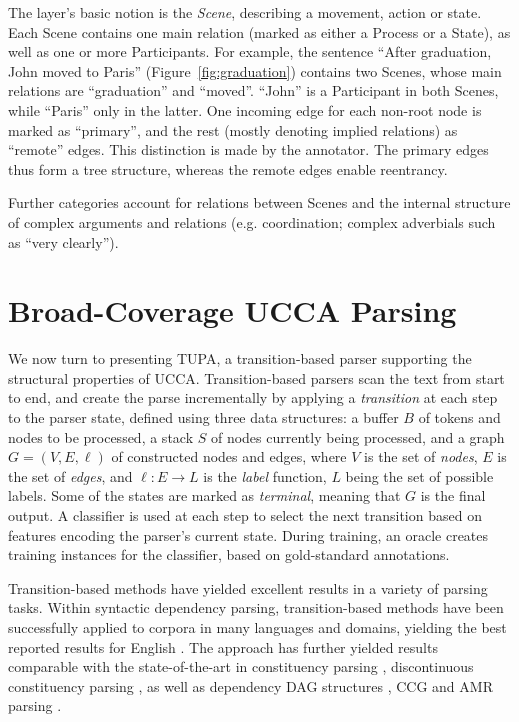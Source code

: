 \documentclass[11pt]{article}
\newcommand{\parser}[1]{TUPA\textsubscript{#1}}
\newcommand{\figref}[1]{Figure~\ref{#1}}
\begin{document}
The layer's basic notion is the {\it Scene}, describing a movement, action or state.
Each Scene contains one main relation (marked as either a Process or a State),
as well as one or more Participants.
For example, the sentence ``After graduation, John moved to Paris'' (\figref{fig:graduation})
contains two Scenes, whose main relations are ``graduation'' and ``moved''.
``John'' is a Participant in both Scenes, while ``Paris'' only in the latter.
One incoming edge for each non-root node is marked as ``primary'',
and the rest (mostly denoting implied relations) as ``remote'' edges.
This distinction is made by the annotator.
The primary edges thus form a tree structure, whereas the remote edges enable reentrancy.

Further categories account for relations between Scenes and the internal structure of
complex arguments and relations (e.g. coordination; complex
adverbials such as ``very clearly'').


\section{Broad-Coverage UCCA Parsing}\label{sec:direct_approach}

We now turn to presenting \parser{},
a transition-based parser supporting the structural properties of UCCA.
Transition-based parsers \cite{Nivre03anefficient} scan the text from start to end,
and create the parse incrementally by applying a \textit{transition}
at each step to the parser state,
defined using three data structures: a buffer $B$ of tokens and nodes to be processed,
a stack $S$ of nodes currently being processed,
and a graph $G=(V,E,\ell)$ of constructed nodes and edges,
where $V$ is the set of \emph{nodes}, $E$ is the set of \emph{edges},
and $\ell : E \to L$ is the \emph{label} function, $L$ being the set of possible labels.
Some of the states are marked as \textit{terminal}, meaning that $G$ is the final output.
A classifier is used at each step to select the next transition based on features
encoding the parser's current state.
During training, an oracle creates training instances for the classifier,
based on gold-standard annotations.

Transition-based methods have yielded excellent
results in a variety of parsing tasks.
Within syntactic dependency parsing, transition-based methods
have been successfully applied to corpora in many languages and domains, yielding
the best reported results for English
\cite{dyer2015transition,andor2016globally,kiperwasser2016simple}.
The approach has further yielded results comparable with the state-of-the-art in
constituency parsing \cite{sagae2005classifier,zhang2009transition,zhu2013fast},
discontinuous constituency parsing \cite{maier2015discontinuous,maier-lichte:2016:DiscoNLP},
as well as dependency DAG structures
\cite{sagae2008shift,ribeyre-villemontedelaclergerie-seddah:2014:SemEval,tokgoz2015transition},
CCG \cite{ambati2015incremental,ambati-deoskar-steedman:2016:N16-1}
and AMR parsing \cite{wang2015transition,wang-EtAl:2016:SemEval,dipendra2016neural}.
\end{document}
